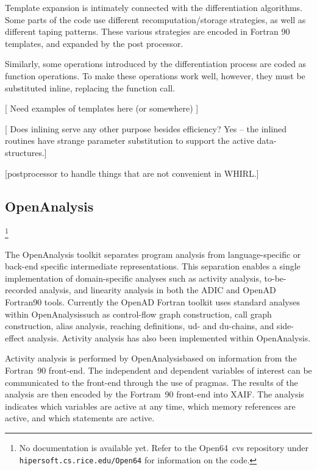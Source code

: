\documentclass[acmtocl,acmnow]{acmtrans2m}
\newcommand{\OpenAnalysis}{OpenAnalysis}
\newcommand{\OpenSixtyFour}{Open64}
\begin{document}
Template expansion is intimately connected with the differentiation
algorithms. Some parts of the code use different recomputation/storage
strategies, as well as different taping patterns. These various
strategies are encoded in Fortran 90 templates, and expanded by the
post processor.

Similarly, some operations introduced by the differentiation process
are coded as function operations. To make these operations work well,
however, they must be substituted inline, replacing the function call.

[ Need examples of templates here (or somewhere) ]

[ Does inlining serve any other purpose besides efficiency?  Yes --
the inlined routines have strange parameter substitution to support
the active data-structures.]

[postprocessor to handle things that are not convenient in WHIRL.]


\subsection{\OpenAnalysis} 

\footnote{No documentation is available yet.  Refer to the
\OpenSixtyFour\ cvs repository under {\tt
hipersoft.cs.rice.edu/Open64} for information on the code.}

The OpenAnalysis toolkit separates program analysis from 
language-specific or back-end specific intermediate representations.
This separation enables a single implementation of domain-specific 
analyses such
as activity analysis, to-be-recorded analysis, and linearity analysis
in both the ADIC and OpenAD Fortran90 tools.  
Currently the OpenAD Fortran toolkit uses standard analyses within 
\OpenAnalysis such as
control-flow graph construction, call graph construction,
alias analysis, reaching definitions, ud- and
du-chains, and side-effect analysis.  Activity analysis has also 
been implemented within \OpenAnalysis.

Activity analysis is performed by \OpenAnalysis based on information
from the Fortran~90 front-end.  The independent and dependent variables of
interest can be communicated to the front-end through the use of pragmas.
The results of the analysis are then 
encoded by the Fortram~90 front-end into XAIF.  The analysis indicates
which variables are active at any time, which memory references are active, 
and which statements are active.
\end{document}

